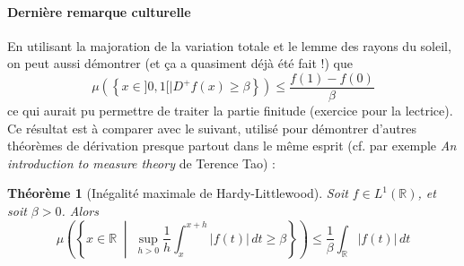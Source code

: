 \documentclass[a4paper, 11pt]{article}
\def\R{\mathbb{R}}
\newtheorem*{theorem}{Théorème}
\begin{document}
\paragraph{Dernière remarque culturelle}

En utilisant la majoration de la variation totale et le lemme des rayons du
soleil, on peut aussi démontrer (et ça a quasiment déjà été fait !) que
\[ \mu\left( \left\{ x \in ]0,1[ \mid D^+f(x) \geq \beta \right\} \right)
  \leq \frac{f(1)-f(0)}{\beta} \]
ce qui aurait pu permettre de traiter la partie finitude (exercice pour la
lectrice). Ce résultat est à comparer avec le suivant, utilisé pour démontrer
d'autres théorèmes de dérivation presque partout dans le même esprit (cf. par
exemple \emph{An introduction to measure theory} de Terence Tao) :
\begin{theorem}[Inégalité maximale de Hardy-Littlewood]
  Soit $f \in L^1(\R)$, et soit $\beta > 0$. Alors
  \[ \mu\left( \left\{ x \in \R \;\middle|\; \sup_{h > 0} \frac{1}{h} \int_x^{x+h}
        |f(t)|\,dt \geq \beta \right\} \right)
    \leq \frac{1}{\beta} \int_\R |f(t)|\,dt \]
\end{theorem}
\end{document}
